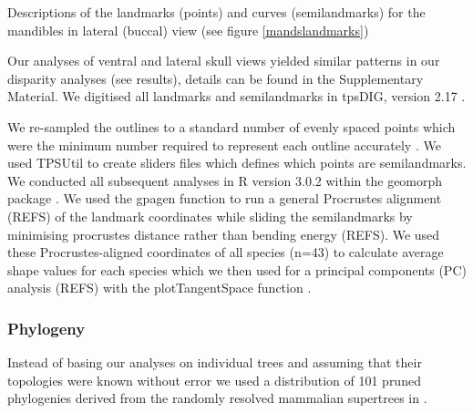\documentclass[12pt,a4paper]{article}
\begin{document}

\begin{table}[H]			
\centering
\caption{Descriptions of the landmarks (points) and curves (semilandmarks) for the mandibles in lateral (buccal) view (see figure \ref{mandslandmarks})}

\label{mandslanddesc} %
\end{table}
 
Our analyses of ventral and lateral skull views yielded similar patterns in our disparity analyses (see results), details can be found in the Supplementary Material. We digitised all landmarks and semilandmarks in tpsDIG, version 2.17 \citep{Rohlf2013}.



We re-sampled the outlines to a standard number of evenly spaced points which were the minimum number required to represent each outline accurately \citep[][details in Supplementary Material]{MacLeod2013}. We used TPSUtil \citep{Rohlf2012} to create sliders files \citep{Zelditch2012} which defines which points are semilandmarks. We conducted all subsequent analyses in R version 3.0.2 \citep[R Development Core][]{Team2013} within the geomorph package \citep{Adams2013}. We used the gpagen function to run a general Procrustes alignment (REFS) of the landmark coordinates while sliding the semilandmarks by minimising procrustes distance rather than bending energy (REFS). We used these Procrustes-aligned coordinates of all species (n=43) to calculate average shape values for each species which we then used for a principal components (PC) analysis (REFS) with the plotTangentSpace function \citep{Adams2013}. 


\subsubsection{Phylogeny} 
Instead of basing our analyses on individual trees and assuming that their topologies were known without error 
\citep[e.g.][]{Ruta2013, Foth2012, Brusatte2008, Harmon2003} we used a distribution of 101 pruned phylogenies derived from the randomly resolved mammalian supertrees in \citep{Kuhn2011}. 
\end{document}
